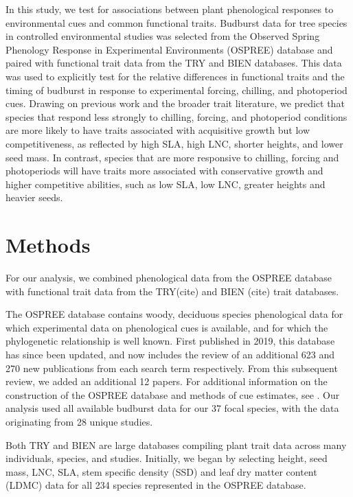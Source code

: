 \documentclass{article}\usepackage[]{graphicx}\usepackage[]{color}
\begin{document}
In this study, we test for associations between plant phenological responses to environmental cues and common functional traits. Budburst data for tree species in controlled environmental studies was selected from the Observed Spring Phenology Response in Experimental Environments (OSPREE) database and paired with functional trait data from the TRY and BIEN databases. This data was used to explicitly test for the relative differences in functional traits and the timing of budburst in response to experimental forcing, chilling, and photoperiod cues. Drawing on previous work and the broader trait literature, we predict that species that respond less strongly to chilling, forcing, and photoperiod conditions are more likely to have traits associated with acquisitive growth but low competitiveness, as reflected by high SLA, high LNC, shorter heights, and lower seed mass. In contrast, species that are more responsive to chilling, forcing and photoperiods will have traits more associated with conservative growth and higher competitive abilities, such as low SLA, low LNC, greater heights and heavier seeds. 


\section{Methods}
For our analysis, we combined phenological data from the OSPREE database \citep{OSPREE} with functional trait data from the TRY(cite) and BIEN (cite) trait databases. 

The OSPREE database contains woody, deciduous species phenological data for which experimental data on phenological cues is available, and for which the phylogenetic relationship is well known. First published in 2019, this database has since been updated, and now includes the review of an additional 623 and 270 new publications from each search term respectively. From this subsequent review, we added an additional 12 papers. For additional information on the construction of the OSPREE database and methods of cue estimates, see \citep{OSPREE}. Our analysis used all available budburst data for our 37 focal species, with the data originating from 28 unique studies. 

Both TRY and BIEN are large databases compiling plant trait data across many individuals, species, and studies. Initially, we began by selecting height, seed mass, LNC, SLA, stem specific density (SSD) and leaf dry matter content (LDMC) data for all 234 species represented in the OSPREE database.  
\end{document}
